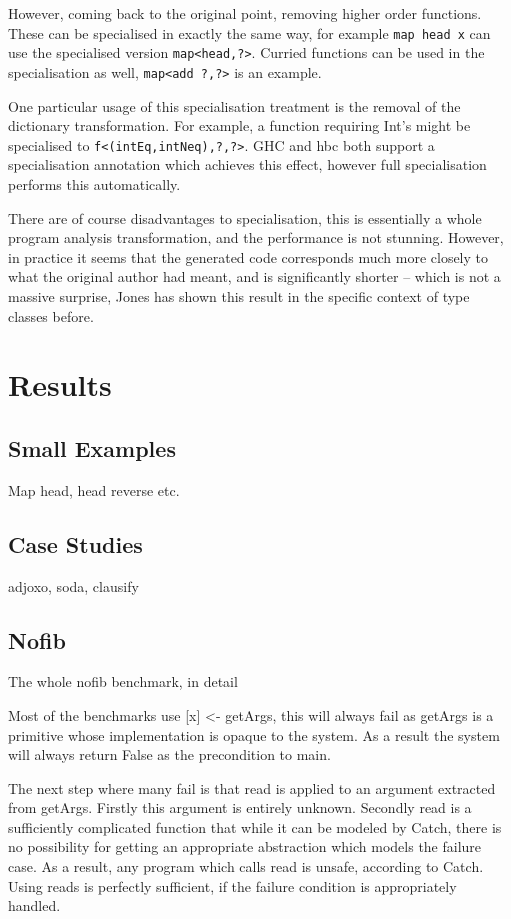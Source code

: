 \documentclass[preprint]{sigplanconf}
\newcommand{\T}[1]{\texttt{#1}}
\begin{document}
However, coming back to the original point, removing higher order functions.
These can be specialised in exactly the same way, for example \T{map head x}
can use the specialised version \T{map<head,?>}. Curried functions can be used
in the specialisation as well, \T{map<add ?,?>} is an example.

One particular usage of this specialisation treatment is the removal of the
dictionary transformation. For example, a function requiring Int's might be
specialised to \T{f<(intEq,intNeq),?,?>}. GHC and hbc both support a
specialisation annotation which achieves this effect, however full
specialisation performs this automatically.

There are of course disadvantages to specialisation, this is essentially a
whole program analysis transformation, and the performance is not stunning.
However, in practice it seems that the generated code corresponds much more
closely to what the original author had meant, and is significantly shorter --
which is not a massive surprise, Jones has shown this result in the specific
context of type classes before.




\section{Results}
\label{sec:results}

\subsection{Small Examples}

Map head, head reverse etc.


\subsection{Case Studies}

adjoxo, soda, clausify

\subsection{Nofib}

The whole nofib benchmark, in detail

Most of the benchmarks use [x] <- getArgs, this will always fail as getArgs is a primitive whose implementation is opaque to the system. As a result the system will always return False as the precondition to main.

The next step where many fail is that read is applied to an argument extracted from getArgs. Firstly this argument is entirely unknown. Secondly read is a sufficiently complicated function that while it can be modeled by Catch, there is no possibility for getting an appropriate abstraction which models the failure case. As a result, any program which calls read is unsafe, according to Catch. Using reads is perfectly sufficient, if the failure condition is appropriately handled.
\end{document}
